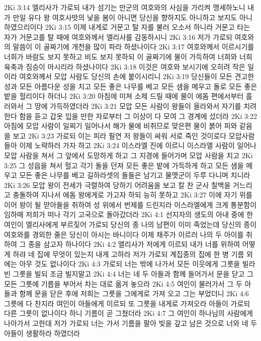 2Ki 3:14  엘리사가 가로되 내가 섬기는 만군의 여호와의 사심을 가리켜 맹세하노니 내가 만일 유다 왕 여호사밧의 낯을 봄이 아니면 당신을 향하지도 아니하고 보지도 아니하였으리이다
2Ki 3:15  이제 내게로 거문고 탈 자를 불러 오소서 하니라 거문고 타는 자가 거문고를 탈 때에 여호와께서 엘리사를 감동하시니
2Ki 3:16  저가 가로되 여호와의 말씀이 이 골짜기에 개천을 많이 파라 하셨나이다
2Ki 3:17  여호와께서 이르시기를 너희가 바람도 보지 못하고 비도 보지 못하되 이 골짜기에 물이 가득하여 너희와 너희 육축과 짐승이 마시리라 하셨나이다
2Ki 3:18  이것은 여호와 보시기에 오히려 작은 일이라 여호와께서 모압 사람도 당신의 손에 붙이시리니
2Ki 3:19  당신들이 모든 견고한 성과 모든 아름다운 성을 치고 모든 좋은 나무를 베고 모든 샘을 메우고 돌로 모든 좋은 밭을 헐리이다 하더니
2Ki 3:20  아침에 미쳐 소제 드릴 때에 물이 에돔 편에서부터 흘러와서 그 땅에 가득하였더라
2Ki 3:21  모압 모든 사람이 왕들이 올라와서 자기를 치려 한다 함을 듣고 갑옷 입을 만한 자로부터 그 이상이 다 모여 그 경계에 섰더라
2Ki 3:22  아침에 모압 사람이 일찌기 일어나서 해가 물에 비취므로 맞은편 물이 붉어 피와 같음을 보고
2Ki 3:23  가로되 이는 피라 필연 저 왕들이 싸워 서로 죽인 것이로다 모압사람들아 이제 노략하러 가자 하고
2Ki 3:24  이스라엘 진에 이르니 이스라엘 사람이 일어나 모압 사람을 쳐서 그 앞에서 도망하게 하고 그 지경에 들어가며 모압 사람을 치고
2Ki 3:25  그 성읍을 쳐서 헐고 각기 돌을 던져 모든 좋은 밭에 가득하게 하고 모든 샘을 메우고 모든 좋은 나무를 베고 길하라셋의 돌들은 남기고 물맷군이 두루 다니며 치니라
2Ki 3:26  모압 왕이 전세가 극렬하여 당하기 어려움을 보고 칼 찬 군사 칠백을 거느리고 충돌하여 지나서 에돔 왕에게로 가고자 하되 능히 못하고
2Ki 3:27  이에 자기 위를 이어 왕이 될 맏아들을 취하여 성 위에서 번제를 드린지라 이스라엘에게 크게 통분함이 임하매 저희가 떠나 각기 고국으로 돌아갔더라
2Ki 4:1  선지자의 생도의 아내 중에 한 여인이 엘리사에게 부르짖어 가로되 당신의 종 나의 남편이 이미 죽었는데 당신의 종이 여호와를 경외한 줄은 당신이 아시는 바니이다 이제 채주가 이르러 나의 두 아이를 취하여 그 종을 삼고자 하나이다
2Ki 4:2  엘리사가 저에게 이르되 내가 너를 위하여 어떻게 하랴 네 집에 무엇이 있는지 내게 고하라 저가 가로되 계집종의 집에 한 병 기름 외에는 아무 것도 없나이다
2Ki 4:3  가로되 너는 밖에 나가서 모든 이웃에게 그릇을 빌라 빈 그릇을 빌되 조금 빌지말고
2Ki 4:4  너는 네 두 아들과 함께 들어가서 문을 닫고 그 모든 그릇에 기름을 부어서 차는 대로 옮겨 놓으라
2Ki 4:5  여인이 물러가서 그 두 아들과 함께 문을 닫은 후에 저희는 그릇을 그에게로 가져 오고 그는 부었더니
2Ki 4:6  그릇에 다 찬지라 여인이 아들에게 이르되 또 그릇을 내게로 가져오라 아들이 가로되 다른 그릇이 없나이다 하니 기름이 곧 그쳤더라
2Ki 4:7  그 여인이 하나님의 사람에게 나아가서 고한대 저가 가로되 너는 가서 기름을 팔아 빚을 갚고 남은 것으로 너와 네 두 아들이 생활하라 하였더라
